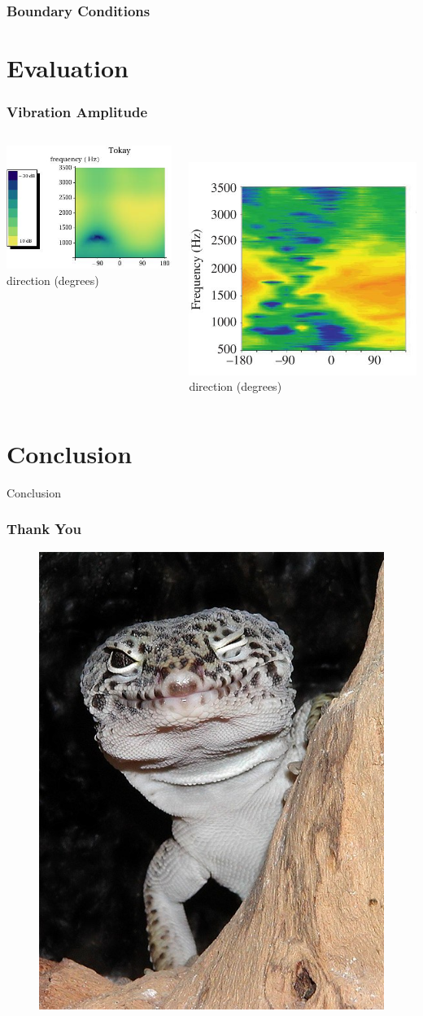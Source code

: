 \documentclass{beamer}
\let\oldfootnotesize\footnotesize
\renewcommand*{\footnotesize}{\oldfootnotesize\tiny}
\begin{document}
\begin{frame}
 \frametitle{Boundary Conditions}
\end{frame}



\section{Evaluation}
\begin{frame}
\frametitle{Vibration Amplitude}
\begin{columns}
    \begin{column}{0.5\textwidth}
      \centering
      \includegraphics[width = 5.6 cm]{Diagrams/Plots/tokayvibamp.jpeg}\\
     
      \footnotesize \hspace{4pt} direction (degrees)
    \end{column}

    \begin{column}{0.5\textwidth}
    \textbf{}\\
    \vspace{1pt}
    \flushright
      \includegraphics[width = 4.25 cm]{Diagrams/Plots/tokayvibamp_exp.jpeg}\\
      \centering
      \footnotesize direction (degrees)
    \end{column}
  \end{columns}
\end{frame}

\section{Conclusion}
\begin{frame}
 Conclusion
\end{frame}

\begin{frame}
 \frametitle{Thank You}
 \begin{figure}
  \centering
  \includegraphics[width=.3\textwidth]{Diagrams/geckowink.jpg}
 \end{figure}
\end{frame}
\end{document}
